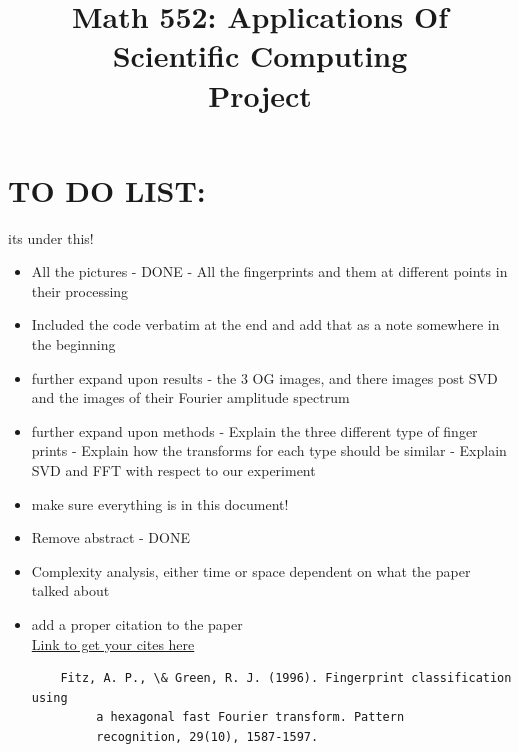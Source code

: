 \documentclass[letter]{amsart}
\title[Math 552: Applications Of Scientific Computing $\mid$ Project ]{Math 552: Applications Of Scientific Computing\\Project}
\author[\StudentName]{\StudentName}
\begin{document}
\maketitle



\section*{\textbf{TO DO LIST:}}
its under this!
\begin{itemize}
	\item All the pictures - DONE
		\subitem - All the fingerprints and them at different points in their processing
	\item Included the code verbatim at the end and add that as a note somewhere in the beginning
	\item further expand upon results
		\subitem - the 3 OG images, and there images post SVD and the images of their Fourier amplitude spectrum
	\item further expand upon methods
		\subitem - Explain the three different type of finger prints
		\subitem - Explain how the transforms for each type should be similar
		\subitem - Explain SVD and FFT with respect to our experiment
	\item make sure everything is in this document!
	\item Remove abstract - DONE
	\item Complexity analysis, either time or space dependent on what the paper talked about
	\item add a  proper citation to the paper \\
	\href{https://scholar.google.com/scholar?hl=en&as_sdt=0%2C22&q=FINGERPRINT+CLASSIFICATION+USING+A+HEXAGONAL+FAST+FOURIER+TRANSFORM&btnG=}{Link to get your cites here} \\
	\begin{verbatim}
	Fitz, A. P., \& Green, R. J. (1996). Fingerprint classification using 
	     a hexagonal fast Fourier transform. Pattern 
	     recognition, 29(10), 1587-1597.
	\end{verbatim}
\end{itemize}
\end{document}
